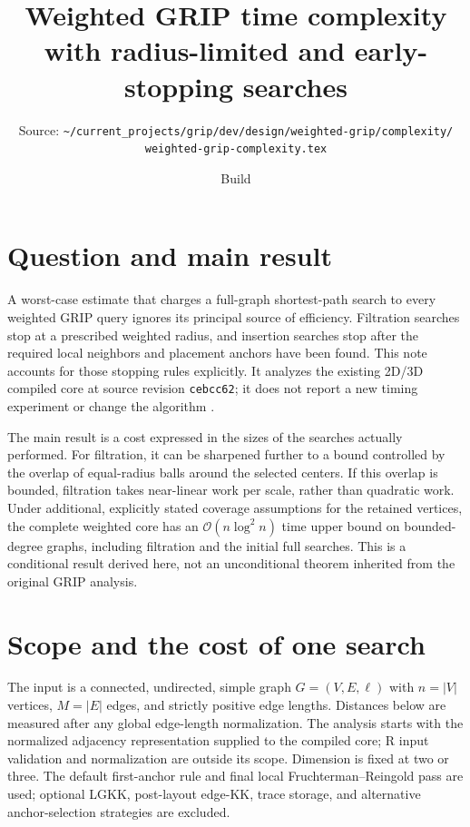 \documentclass[11pt,a4paper]{article}
\title{Weighted GRIP time complexity\\with radius-limited and early-stopping searches}
\author{\small\begin{minipage}{0.95\textwidth}\centering
Source: \nolinkurl{~/current_projects/grip/dev/design/weighted-grip/complexity/}\\
\nolinkurl{weighted-grip-complexity.tex}
\end{minipage}}
\date{Build \reportbuilddatetime}
\newcommand{\bigO}{\mathcal O}
\newcommand{\code}[1]{\texttt{#1}}
\begin{document}
\maketitle

\section{Question and main result}

A worst-case estimate that charges a full-graph shortest-path search to every
weighted GRIP query ignores its principal source of efficiency. Filtration
searches stop at a prescribed weighted radius, and insertion searches stop after
the required local neighbors and placement anchors have been found. This note
accounts for those stopping rules explicitly. It analyzes the existing 2D/3D
compiled core at source revision \code{cebcc62}; it does not report a new timing
experiment or change the algorithm \citep{gripcode2026}.

The main result is a cost expressed in the sizes of the searches actually
performed. For filtration, it can be sharpened further to a bound controlled by
the overlap of equal-radius balls around the selected centers. If this overlap
is bounded, filtration takes near-linear work per scale, rather than quadratic
work. Under additional, explicitly stated coverage assumptions for the retained
vertices, the complete weighted core has an $\bigO(n\log^2 n)$ time upper bound
on bounded-degree graphs, including filtration and the initial full searches. This is
a conditional result derived here, not an unconditional theorem inherited from
the original GRIP analysis.

\section{Scope and the cost of one search}

The input is a connected, undirected, simple graph $G=(V,E,\ell)$ with $n=|V|$
vertices, $M=|E|$ edges, and strictly positive edge lengths. Distances below are
measured after any global edge-length normalization. The analysis starts with
the normalized adjacency representation supplied to the compiled core; R input
validation and normalization are outside its scope. Dimension is fixed at two
or three. The default first-anchor rule and final local Fruchterman--Reingold
pass are used; optional LGKK, post-layout edge-KK, trace storage, and alternative
anchor-selection strategies are excluded.
\end{document}
